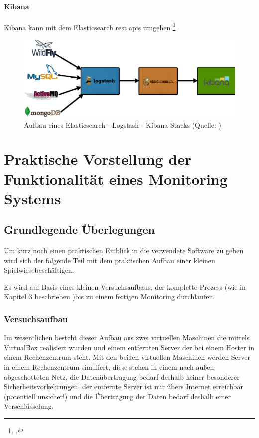 \documentclass[12pt,a4paper,parskip,listof=totoc,bibliography=totoc]{scrreprt}
\begin{document}
	\subsubsection{Kibana}
	Kibana kann mit dem Elasticsearch \acrshort{rest} \acrshort{api}s umgehen \footcite{kibana}
	\begin{figure}[h!]
		\centering
		\includegraphics[width=1\textwidth]{pics/elk-stack.eps}
		\caption[Aufbau eines Elasticsearch - Logstash - Kibana Stacks]{Aufbau eines Elasticsearch - Logstash - Kibana Stacks (Quelle: \textcite{elkstackpic})}
		\label{fig:elk}
	\end{figure}
	\clearpage
	\chapter{Praktische Vorstellung der Funktionalität eines Monitoring Systems}
	\section{Grundlegende Überlegungen}
	Um kurz noch einen praktischen Einblick in die verwendete Software zu geben wird sich der folgende Teil mit dem praktischen Aufbau einer kleinen \glqq Spielwiese\grqq beschäftigen. 
	
	Es wird auf Basis eines kleinen Versuchsaufbaus, der komplette Prozess (wie in Kapitel 3 beschrieben )bis zu einem fertigen Monitoring durchlaufen.
	\subsection{Versuchsaufbau}
	Im wesentlichen besteht dieser Aufbau aus zwei virtuellen Maschinen die mittels VirtualBox realisiert wurden und einem entfernten Server der bei einem Hoster in einem Rechenzentrum steht. Mit den beiden virtuellen Maschinen werden Server in einem Rechenzentrum simuliert, diese stehen in einem nach außen abgeschotteten Netz, die Datenübertragung bedarf deshalb keiner besonderer Sicherheitsvorkehrungen, der entfernte Server ist nur übers Internet erreichbar (potentiell unsicher!) und die Übertragung der Daten bedarf deshalb einer Verschlüsselung.
\end{document}
